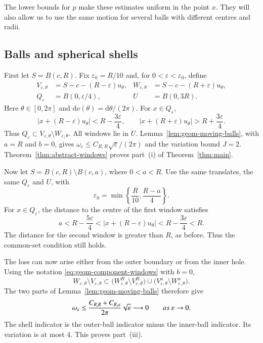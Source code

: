 \documentclass[10pt,a4paper]{amsart}
\def\d{\mathrm{d}}
\newcommand\1{\mathbbm{1}}
\newcommand{\eps}{\varepsilon}
\def\d{\mathrm{d}}
\begin{document}
The lower bounds for $p$ make these estimates uniform in the point $x$.
They will also allow us to use the same motion for several balls with
different centres and radii.

\subsection{Balls and spherical shells}\label{subsec:balls-shells}

First let $S=B(c,R)$. Fix $\eps_0=R/10$ and, for $0<\eps<\eps_0$, define
\begin{equation}\label{eq:geom-ball-windows}
    \begin{aligned}
        V_{\eps,\theta}&=S-c-(R-\eps)u_\theta,
        &W_{\eps,\theta}&=S-c-(R+\eps)u_\theta,\\
        Q_\eps&=B(0,\eps/4),
        &U&=B(0,3R).
    \end{aligned}
\end{equation}
Here $\theta\in[0,2\pi]$ and $\d\nu(\theta)=\d\theta/(2\pi)$.
For $x\in Q_\eps$,
\begin{equation*}
    |x+(R-\eps)u_\theta|<R-\frac{3\eps}{4},
    \qquad
    |x+(R+\eps)u_\theta|>R+\frac{3\eps}{4}.
\end{equation*}
Thus $Q_\eps\subset V_{\eps,\theta}\setminus W_{\eps,\theta}$.
All windows lie in $U$. Lemma~\ref{lem:geom-moving-balls}, with $a=R$ and
$b=0$, gives $\omega_\eps\le C_{R,R}\sqrt{\eps}/(2\pi)$ and the variation
bound $J=2$. Theorem~\ref{thm:abstract-windows} proves part~(i) of
Theorem~\ref{thm:main}.

Now let $S=B(c,R)\setminus B(c,a)$, where $0<a<R$. Use the same translates,
the same $Q_\eps$ and $U$, with
\begin{equation*}
    \eps_0=\min\left\{\frac R{10},\frac{R-a}{4}\right\}.
\end{equation*}
For $x\in Q_\eps$, the distance to the centre of the first window satisfies
\begin{equation*}
    a<R-\frac{5\eps}{4}
    <|x+(R-\eps)u_\theta|
    <R-\frac{3\eps}{4}<R.
\end{equation*}
The distance for the second window is greater than $R$, as before.
Thus the common-set condition still holds.

The loss can now arise either from the outer boundary or from the inner hole.
Using the notation \eqref{eq:geom-component-windows} with $b=0$,
\begin{equation}\label{eq:geom-shell-loss}
    W_{\eps,\theta}\setminus V_{\eps,\theta}
    \subset
    \bigl(W_{\eps,\theta}^{R}\setminus V_{\eps,\theta}^{R}\bigr)
    \cup
    \bigl(V_{\eps,\theta}^{a}\setminus W_{\eps,\theta}^{a}\bigr).
\end{equation}
The two parts of Lemma~\ref{lem:geom-moving-balls} therefore give
\begin{equation*}
    \omega_\eps
    \le\frac{C_{R,R}+C_{R,a}}{2\pi}\sqrt{\eps}
    \longrightarrow0\qquad{\rm{as}}\ \eps\to0.
\end{equation*}
The shell indicator is the outer-ball indicator minus the inner-ball
indicator. Its variation is at most $4$.
This proves part~(iii).
\end{document}
